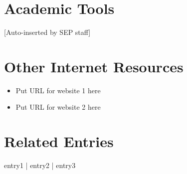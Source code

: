 \documentclass{article}
\begin{document}
\section*{Academic Tools}

[Auto-inserted by SEP staff]

\section*{Other Internet Resources}

\begin{itemize}

\item Put URL for website 1 here

\item Put URL for website 2 here

\end{itemize}


\section*{Related Entries}


entry1 | entry2 | entry3
\end{document}
